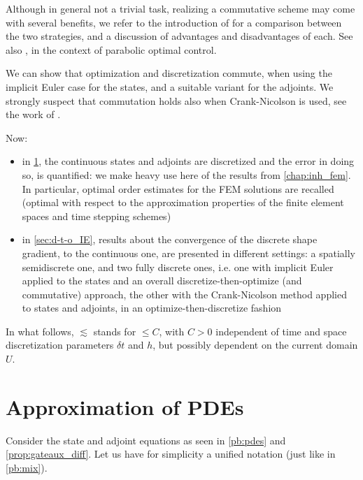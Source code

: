 \documentclass[english,a4paper,10pt,oneside]{scrbook}	%
\theoremstyle{break}
\theoremstyle{remark}
\begin{document}
Although in general not a trivial task, realizing a commutative scheme may come with several benefits, we refer to the introduction of \cite{liu} for a comparison between the two strategies, and a discussion of advantages and disadvantages of each. See also \cite{flaig}, in the context of parabolic optimal control.

We can show that optimization and discretization commute, when using the implicit Euler case for the states, and a suitable variant for the adjoints. We strongly suspect that commutation holds also when Crank-Nicolson is used, see the work of \cite{flaig}.

Now:

\begin{itemize}
	\item in \cref{sec:o-t-d}, the continuous states and adjoints are discretized and the error in doing so, is quantified: we make heavy use here of the results from \cref{chap:inh_fem}. In particular, optimal order estimates for the FEM solutions are recalled (optimal with respect to the approximation properties of the finite element spaces and time stepping schemes)
	\item in \cref{sec:d-t-o_IE}, results about the convergence of the discrete shape gradient, to the continuous one, are presented in different settings: a spatially semidiscrete one, and two fully discrete ones, i.e. one with implicit Euler applied to the states and an overall discretize-then-optimize (and commutative) approach, the other with the Crank-Nicolson method applied to states and adjoints, in an optimize-then-discretize fashion
\end{itemize}

In what follows, $\lesssim$ stands for $\leq C$, with $C>0$ independent of time and space discretization parameters $\delta t$ and $h$, but possibly dependent on the current domain $U$.

\section{Approximation of PDEs}
\label{sec:o-t-d}

Consider the state and adjoint equations as seen in \cref{pb:pdes} and \cref{prop:gateaux_diff}. Let us have for simplicity a unified notation (just like in \cref{pb:mix}).
\end{document}
